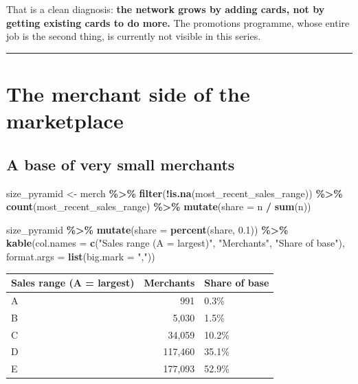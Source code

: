 \documentclass[
]{article}
\newenvironment{Shaded}{\begin{snugshade}}{\end{snugshade}}
\newcommand{\AttributeTok}[1]{\textcolor[rgb]{0.13,0.29,0.53}{#1}}
\newcommand{\FloatTok}[1]{\textcolor[rgb]{0.00,0.00,0.81}{#1}}
\newcommand{\FunctionTok}[1]{\textcolor[rgb]{0.13,0.29,0.53}{\textbf{#1}}}
\newcommand{\NormalTok}[1]{#1}
\newcommand{\OtherTok}[1]{\textcolor[rgb]{0.56,0.35,0.01}{#1}}
\newcommand{\SpecialCharTok}[1]{\textcolor[rgb]{0.81,0.36,0.00}{\textbf{#1}}}
\newcommand{\StringTok}[1]{\textcolor[rgb]{0.31,0.60,0.02}{#1}}
\newcounter{none} %
\begin{document}
That is a clean diagnosis: \textbf{the network grows by adding cards,
not by getting existing cards to do more.} The promotions programme,
whose entire job is the second thing, is currently not visible in this
series.

\begin{center}\rule{0.5\linewidth}{0.5pt}\end{center}

\section{The merchant side of the
marketplace}\label{the-merchant-side-of-the-marketplace}

\subsection{A base of very small
merchants}\label{a-base-of-very-small-merchants}

\begin{Shaded}
\begin{Highlighting}[]
\NormalTok{size\_pyramid }\OtherTok{\textless{}{-}}\NormalTok{ merch }\SpecialCharTok{\%\textgreater{}\%} \FunctionTok{filter}\NormalTok{(}\SpecialCharTok{!}\FunctionTok{is.na}\NormalTok{(most\_recent\_sales\_range)) }\SpecialCharTok{\%\textgreater{}\%}
  \FunctionTok{count}\NormalTok{(most\_recent\_sales\_range) }\SpecialCharTok{\%\textgreater{}\%} \FunctionTok{mutate}\NormalTok{(}\AttributeTok{share =}\NormalTok{ n }\SpecialCharTok{/} \FunctionTok{sum}\NormalTok{(n))}

\NormalTok{size\_pyramid }\SpecialCharTok{\%\textgreater{}\%} \FunctionTok{mutate}\NormalTok{(}\AttributeTok{share =} \FunctionTok{percent}\NormalTok{(share, }\FloatTok{0.1}\NormalTok{)) }\SpecialCharTok{\%\textgreater{}\%}
  \FunctionTok{kable}\NormalTok{(}\AttributeTok{col.names =} \FunctionTok{c}\NormalTok{(}\StringTok{"Sales range (A = largest)"}\NormalTok{, }\StringTok{"Merchants"}\NormalTok{, }\StringTok{"Share of base"}\NormalTok{),}
        \AttributeTok{format.args =} \FunctionTok{list}\NormalTok{(}\AttributeTok{big.mark =} \StringTok{","}\NormalTok{))}
\end{Highlighting}
\end{Shaded}

{\def\LTcaptype{none} %
\begin{longtable}[]{@{}lrl@{}}
\toprule\noalign{}
Sales range (A = largest) & Merchants & Share of base \\
\midrule\noalign{}
\endhead
\bottomrule\noalign{}
\endlastfoot
A & 991 & 0.3\% \\
B & 5,030 & 1.5\% \\
C & 34,059 & 10.2\% \\
D & 117,460 & 35.1\% \\
E & 177,093 & 52.9\% \\
\end{longtable}
}
\end{document}
